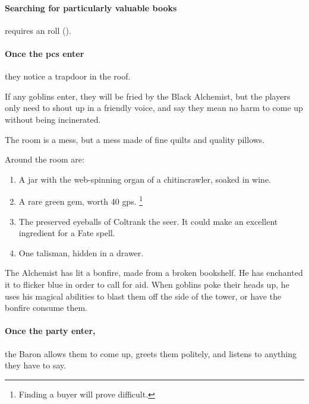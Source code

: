 \begin{multicols}{2}
\paragraph{Searching for particularly valuable books}
requires an  roll (\tn[12]).

\paragraph{Once the \glspl{pc} enter}
they notice a trapdoor in the roof.

If any goblins enter, they will be fried by the Black Alchemist, but the players only need to shout up in a friendly voice, and say they mean no harm to come up without being incinerated.


The room is a mess, but a mess made of fine quilts and quality pillows.

Around the room are:

\begin{enumerate}

  \item{A jar with the web-spinning organ of a chitincrawler, soaked in wine.}
  \item{A rare green gem, worth 40 \glspl{gp}.%
  \footnote{Finding a buyer will prove difficult.}}
  \item{The preserved eyeballs of Coltrank the seer.
  It could make an excellent \gls{ingredient} for a Fate spell.}
  \item
  One \lootMagic \gls{talisman}, hidden in a drawer.

  \showTalisman

\end{enumerate}


\begin{exampletext}
  The Alchemist has lit a bonfire, made from a broken bookshelf.
  He has enchanted it to flicker blue in order to call for aid.
  When goblins poke their heads up, he uses his magical abilities to blast them off the side of the tower, or have the bonfire consume them.
\end{exampletext}

\paragraph{Once the party enter,}
the Baron allows them to come up, greets them politely, and listens to anything they have to say.


\end{multicols}
